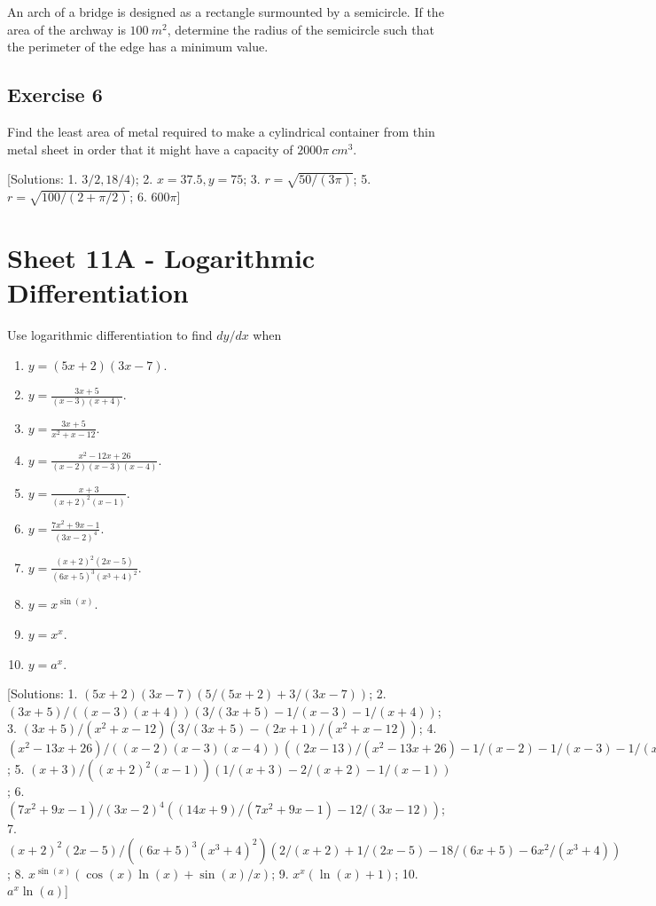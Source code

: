 \documentclass[
  11pt,
  oneside]{book}
\providecommand{\tightlist}{%
  \setlength{\itemsep}{0pt}\setlength{\parskip}{0pt}}
\newcommand{\slide}{}
\theoremstyle{definition}
\theoremstyle{definition}
\theoremstyle{definition}
\theoremstyle{definition}
\theoremstyle{remark}
\begin{document}
An arch of a bridge is designed as a rectangle surmounted by a semicircle. If the area of the archway is \(100\ m^2\), determine the radius of the semicircle such that the perimeter of the edge has a minimum value.

\slide

\subsection*{Exercise 6}\label{exercise-6-2}

Find the least area of metal required to make a cylindrical container from thin metal sheet in order that it might have a capacity of \(2000\pi\ cm^3\).

{[}Solutions: 1. \(3/2,18/4)\); 2. \(x=37.5, y = 75\); 3. \(r=\sqrt{50/(3\pi)}\); 5. \(r=\sqrt{100/(2+\pi/2)}\); 6. \(600\pi\){]}
\slide

\section{Sheet 11A - Logarithmic Differentiation}\label{sheet-11a---logarithmic-differentiation}

Use logarithmic differentiation to find \(dy/dx\) when

\begin{enumerate}
\def\labelenumi{\arabic{enumi}.}
\tightlist
\item
  \(y = (5x+2)(3x-7)\).
\item
  \(y = \frac{3x+5}{(x-3)(x+4)}\).
\item
  \(y = \frac{3x+5}{x^2+x-12}\).
\item
  \(y = \frac{x^2-12x+26}{(x-2)(x-3)(x-4)}\).
\item
  \(y = \frac{x+3}{(x+2)^2(x-1)}\).
\item
  \(y = \frac{7x^2+9x-1}{(3x-2)^4}\).
\item
  \(y = \frac{(x+2)^2(2x-5)}{(6x+5)^3(x^3+4)^2}\).
\item
  \(y = x^{\sin(x)}\).
\item
  \(y = x^x\).
\item
  \(y = a^x\).
\end{enumerate}

{[}Solutions: 1. \((5x+2)(3x-7)\left(5/(5x+2)+3/(3x-7)\right)\); 2. \((3x+5)/((x-3)(x+4))\left(3/(3x+5)-1/(x-3)-1/(x+4)\right)\); 3. \((3x+5)/(x^2+x-12)\left(3/(3x+5)-(2x+1)/(x^2+x-12)\right)\); 4. \((x^2-13x+26)/((x-2)(x-3)(x-4))\left((2x-13)/(x^2-13x+26)-1/(x-2)-1/(x-3)-1/(x-4)\right)\); 5. \((x+3)/((x+2)^2(x-1))\left(1/(x+3)-2/(x+2)-1/(x-1)\right)\); 6. \((7x^2+9x-1)/(3x-2)^4\left((14x+9)/(7x^2+9x-1)-12/(3x-12)\right)\); 7. \((x+2)^2(2x-5)/((6x+5)^3(x^3+4)^2)\left(2/(x+2)+1/(2x-5)-18/(6x+5)-6x^2/(x^3+4)\right)\); 8. \(x^{\sin(x)}\left(\cos(x)\ln(x)+\sin(x)/x\right)\); 9. \(x^x(\ln(x)+1)\); 10. \(a^x\ln(a)\){]}
\end{document}
